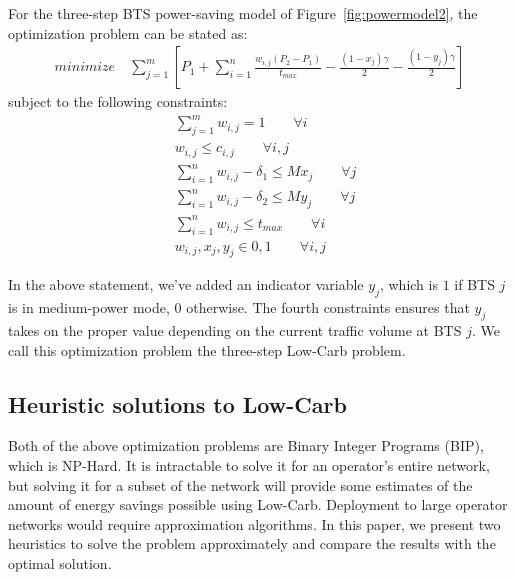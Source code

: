 For the three-step BTS power-saving model of Figure~\ref{fig:powermodel2}, the optimization problem can be stated as:
\begin{align}
\textit{minimize} \quad \sum_{j=1}^{m} \left[
P_1+\sum_{i=1}^{n}\frac{w_{i,j}(P_2-P_1)}{t_{max}}-\frac{(1-x_j)\gamma}{2}-\frac{(1-y_j)\gamma}{2}
\right]
\end{align}
subject to the following constraints:
\begin{align}
& \sum_{j=1}^m w_{i,j} = 1 \qquad \forall i \\
& w_{i,j} \leq c_{i,j} \qquad \forall i, j \\
& \sum_{i=1}^nw_{i,j}-\delta_1 \leq Mx_j \qquad \forall j\\
& \sum_{i=1}^nw_{i,j}-\delta_2 \leq My_j \qquad \forall j\\
& \sum_{i=1}^n w_{i,j} \le t_{max} \qquad \forall i \\
& w_{i,j}, x_j, y_j\in {0,1} \qquad \forall i, j%
\end{align}

In the above statement, we've added an indicator variable $y_j$, which is $1$ if BTS $j$ is in medium-power mode, $0$ otherwise. The fourth constraints ensures that $y_j$ takes on the proper value depending on the current traffic volume at BTS $j$. We call this optimization problem the three-step Low-Carb problem.


\subsection{Heuristic solutions to Low-Carb}
\label{subsec:heuristics} Both of the above optimization problems are Binary Integer Programs
(BIP), which is NP-Hard. It is intractable to solve it for an
operator's entire network, but solving it for a subset of the
network will provide some estimates of the amount of energy
savings possible using Low-Carb. Deployment to large operator
networks would require approximation algorithms. In this paper, we present two heuristics to solve the problem approximately and compare the results with the optimal solution.

